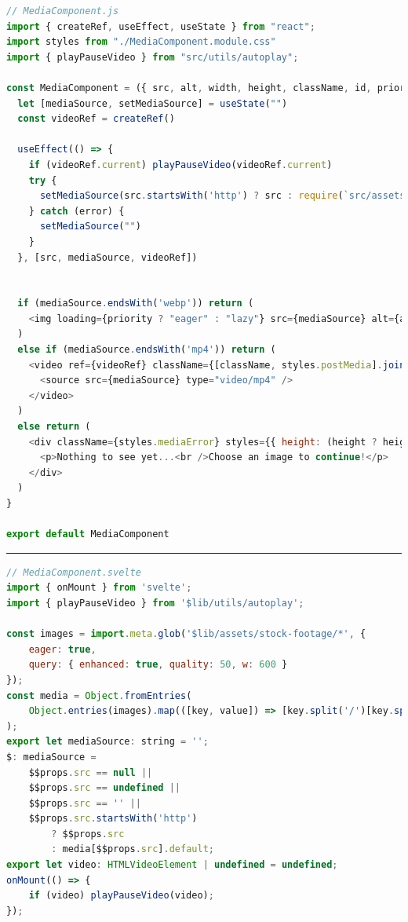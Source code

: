 \documentclass[a4paper, 12pt]{article}
\begin{document}
\begin{lstlisting}[caption=MediaComponent in React, label={lst:React:MediaComponent}, language=JavaScript, escapechar=°]
// MediaComponent.js
import { createRef, useEffect, useState } from "react";
import styles from "./MediaComponent.module.css"
import { playPauseVideo } from "src/utils/autoplay";

const MediaComponent = ({ src, alt, width, height, className, id, priority = false }) => {
  let [mediaSource, setMediaSource] = useState("")
  const videoRef = createRef()

  useEffect(() => {
    if (videoRef.current) playPauseVideo(videoRef.current)
    try {
      setMediaSource(src.startsWith('http') ? src : require(`src/assets/stock-footage/${src}`))°\label{line:React:MediaComponent:imageImport}°
    } catch (error) {
      setMediaSource("")
    }
  }, [src, mediaSource, videoRef])


  if (mediaSource.endsWith('webp')) return (
    <img loading={priority ? "eager" : "lazy"} src={mediaSource} alt={alt} width={width} height={height} className={[className, styles.postMedia].join(" ")} id={id} />
  )
  else if (mediaSource.endsWith('mp4')) return (
    <video ref={videoRef} className={[className, styles.postMedia].join(" ")} id={id} width={width} preload="metadata" controls controlsList="nodownload,nofullscreen,noremoteplayback" disablePictureInPicture loop muted >
      <source src={mediaSource} type="video/mp4" />
    </video>
  )
  else return (
    <div className={styles.mediaError} styles={{ height: (height ? height + 'px' : '300px'), width: width.endsWith("%") ? width : width + "px" }}>
      <p>Nothing to see yet...<br />Choose an image to continue!</p>
    </div>
  )
}

export default MediaComponent
\end{lstlisting}

\vspace{0.5cm} \hrule \vspace{0.5cm}

\begin{lstlisting}[caption=MediaComponent in Svelte (Script), label={lst:Svelte:MediaComponent:Script}, language=JavaScript]
// MediaComponent.svelte
import { onMount } from 'svelte';
import { playPauseVideo } from '$lib/utils/autoplay';

const images = import.meta.glob('$lib/assets/stock-footage/*', {
	eager: true,
	query: { enhanced: true, quality: 50, w: 600 }
});
const media = Object.fromEntries(
	Object.entries(images).map(([key, value]) => [key.split('/')[key.split('/').length - 1], value])
);
export let mediaSource: string = '';
$: mediaSource =
	$$props.src == null ||
	$$props.src == undefined ||
	$$props.src == '' ||
	$$props.src.startsWith('http')
		? $$props.src
		: media[$$props.src].default;
export let video: HTMLVideoElement | undefined = undefined;
onMount(() => {
	if (video) playPauseVideo(video);
});
\end{lstlisting}
\end{document}
